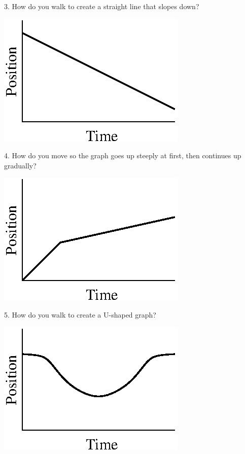 3. How do you walk to create a straight line that slopes down?

\vspace{0.3cm}
{\par\raggedright \includegraphics{position/position_fig7.eps} \par}
\vspace{0.3cm}

4. How do you move so the graph goes up steeply at first, then continues up
gradually?

\vspace{0.3cm}
{\par\raggedright \includegraphics{position/position_fig8.eps} \par}
\vspace{0.3cm}

5. How do you walk to create a U-shaped graph?

\vspace{0.3cm}
{\par\raggedright \includegraphics{position/position_fig9.eps} \par}
\vspace{0.3cm}

